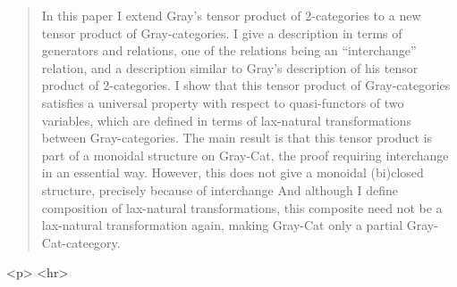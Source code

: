 \begin{quote}
     In this paper I extend Gray's tensor product of 2-categories to a
     new tensor product of Gray-categories. I give a description in
     terms of generators and relations, one of the relations being an
     ``interchange'' relation, and a description similar to Gray's
     description of his tensor product of 2-categories. I show that this
     tensor product of Gray-categories satisfies a universal property
     with respect to quasi-functors of two variables, which are defined
     in terms of lax-natural transformations between
     Gray-categories. The main result is that this tensor product is
     part of a monoidal structure on Gray-Cat, the proof requiring
     interchange in an essential way.  However, this does not give a
     monoidal {(bi)closed} structure, precisely because of interchange
     And although I define composition of lax-natural transformations,
     this composite need not be a lax-natural transformation again,
     making Gray-Cat only a partial Gray-Cat-cateegory.
\end{quote}
    


<p> <hr>



